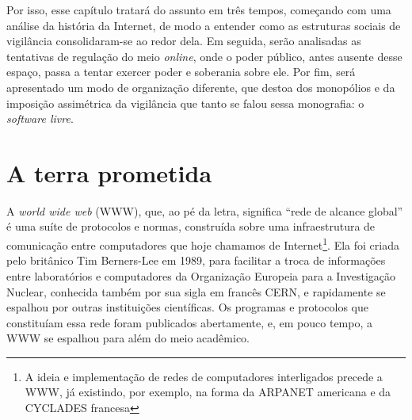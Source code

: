 Por isso, esse capítulo tratará do assunto em três tempos, começando com uma análise da história da Internet, de modo a entender como as estruturas sociais de vigilância consolidaram-se ao redor dela.
Em seguida, serão analisadas as tentativas de regulação do meio \textit{online}, onde o poder público, antes ausente desse espaço, passa a tentar exercer poder e soberania sobre ele.
Por fim, será apresentado um modo de organização diferente, que destoa dos monopólios e da imposição assimétrica da vigilância que tanto se falou sessa monografia: o \textit{software livre}.

\section{A terra prometida}

A \textit{world wide web} (WWW), que, ao pé da letra, significa ``rede de alcance global'' é uma suíte de protocolos e normas, construída sobre uma infraestrutura de comunicação entre computadores que hoje chamamos de Internet\footnote{A ideia e implementação de redes de computadores interligados precede a WWW, já existindo, por exemplo, na forma da ARPANET americana e da CYCLADES francesa}.
Ela foi criada pelo britânico Tim Berners-Lee em 1989, para facilitar a troca de informações entre laboratórios e computadores da Organização Europeia para a Investigação Nuclear, conhecida também por sua sigla em francês CERN, e rapidamente se espalhou por outras instituições científicas.
Os programas e protocolos que constituíam essa rede foram publicados abertamente, e, em pouco tempo, a WWW se espalhou para além do meio acadêmico.

